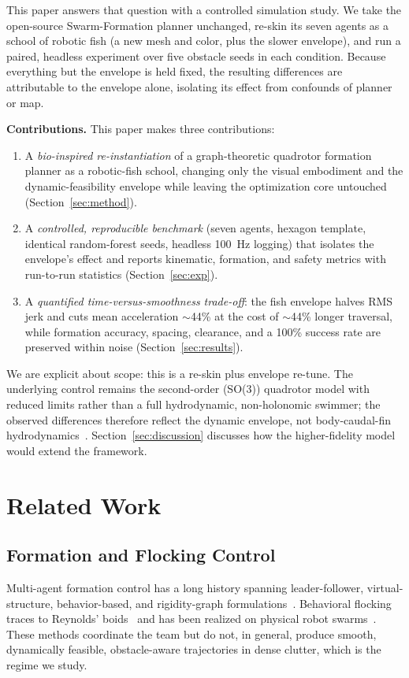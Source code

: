 \documentclass[journal]{IEEEtran}
\begin{document}
This paper answers that question with a controlled simulation study. We take
the open-source Swarm-Formation planner unchanged, re-skin its seven agents
as a school of robotic fish (a new mesh and color, plus the slower envelope),
and run a paired, headless experiment over five obstacle seeds in each
condition. Because everything but the envelope is held fixed, the resulting
differences are attributable to the envelope alone, isolating its effect from
confounds of planner or map.

\textbf{Contributions.} This paper makes three contributions:
\begin{enumerate}
  \item A \emph{bio-inspired re-instantiation} of a graph-theoretic
  quadrotor formation planner as a robotic-fish school, changing only the
  visual embodiment and the dynamic-feasibility envelope while leaving the
  optimization core untouched (Section~\ref{sec:method}).
  \item A \emph{controlled, reproducible benchmark} (seven agents, hexagon
  template, identical random-forest seeds, headless 100~Hz logging) that
  isolates the envelope's effect and reports kinematic, formation, and safety
  metrics with run-to-run statistics (Section~\ref{sec:exp}).
  \item A \emph{quantified time-versus-smoothness trade-off}: the fish
  envelope halves RMS jerk and cuts mean acceleration $\sim$44\% at the cost
  of $\sim$44\% longer traversal, while formation accuracy, spacing,
  clearance, and a 100\% success rate are preserved within noise
  (Section~\ref{sec:results}).
\end{enumerate}

We are explicit about scope: this is a re-skin plus envelope re-tune. The
underlying control remains the second-order (SO(3)) quadrotor model with
reduced limits rather than a full hydrodynamic, non-holonomic swimmer; the
observed differences therefore reflect the dynamic envelope, not body-caudal-fin
hydrodynamics~\cite{lighthill1971large}. Section~\ref{sec:discussion}
discusses how the higher-fidelity model would extend the framework.

\section{Related Work}

\subsection{Formation and Flocking Control}
Multi-agent formation control has a long history spanning leader-follower,
virtual-structure, behavior-based, and rigidity-graph
formulations~\cite{oh2015survey}. Behavioral flocking traces to Reynolds'
boids~\cite{reynolds1987flocks} and has been realized on physical robot
swarms~\cite{turgut2008self}. These methods coordinate the team but do not,
in general, produce smooth, dynamically feasible, obstacle-aware trajectories
in dense clutter, which is the regime we study.
\end{document}
